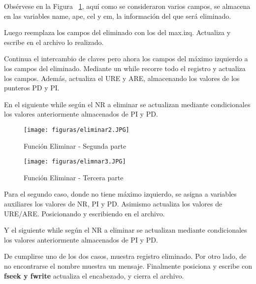\documentclass[10pt,conference]{IEEEtran}
\begin{document}
\begin{enumerate}[]
        Obsérvese en la Figura ~\ref{feliminar2}, aquí como se consideraron varios campos, se almacena en las variables name, ape, cel y em, la información del que será eliminado.
        
        Luego reemplaza los campos del eliminado con los del max.izq. Actualiza y escribe en el archivo lo realizado.
        
        Continua el intercambio de claves pero ahora los campos del máximo izquierdo a los campos del eliminado. Mediante un while recorre todo el registro y actualiza los campos. Además, actualiza el URE y ARE, almacenando los valores de los punteros PD y PI.
        
        En el siguiente while según el NR a eliminar se actualizan mediante condicionales los valores anteriormente almacenados de PI y PD.
        
        \begin{figure}[H]
            \begin{center}
            \texttt{[image: figuras/eliminar2.JPG]}
            \caption{Función Eliminar - Segunda parte}
             \label{feliminar2} 
             \end{center}
        \end{figure}
        \begin{figure}[H]
            \begin{center}
            \texttt{[image: figuras/elimnar3.JPG]}
            \caption{Función Eliminar - Tercera parte}
             \label{feliminar3} 
             \end{center}
        \end{figure}
        
        Para el segundo caso, donde no tiene máximo izquierdo, se asigna a variables auxiliares los valores de NR, PI y PD. Asimismo actualiza los valores de URE/ARE. Posicionando y escribiendo en el archivo.
        
        Y el siguiente while según el NR a eliminar se actualizan mediante condicionales los valores anteriormente almacenados de PI y PD.
        
        De cumplirse uno de los dos casos, muestra registro eliminado. Por otro lado, de no encontrarse el nombre muestra un mensaje. Finalmente posiciona y escribe con \textbf{fseek y fwrite} actualiza el encabezado, y cierra el archivo.
        

\end{enumerate}
\end{document}
